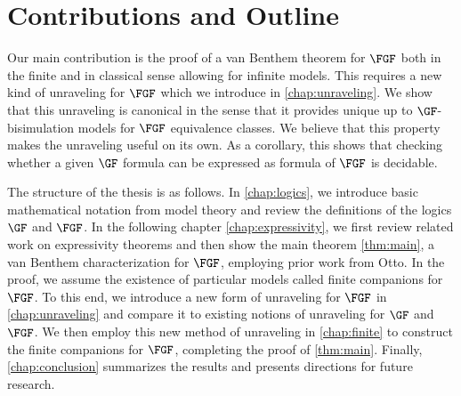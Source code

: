 \section{Contributions and Outline}

Our main contribution is the proof of a van Benthem theorem for $\FGF$ both in the finite and in classical sense allowing for infinite models.
This requires a new kind of unraveling for $\FGF$ which we introduce in \ref{chap:unraveling}.
We show that this unraveling is canonical in the sense that it provides unique up to $\GF$-bisimulation models for $\FGF$ equivalence classes.
We believe that this property makes the unraveling useful on its own.
As a corollary, this shows that checking whether a given $\GF$ formula can be expressed as formula of $\FGF$ is decidable.

The structure of the thesis is as follows.
In \cref{chap:logics}, we introduce basic mathematical notation from model theory and review the definitions of the logics $\GF$ and $\FGF$.
In the following chapter \cref{chap:expressivity}, we first review related work on expressivity theorems and then show the main theorem \cref{thm:main}, a van Benthem characterization for $\FGF$, employing prior work from Otto.
In the proof, we assume the existence of particular models called finite companions for $\FGF$.
To this end, we introduce a new form of unraveling for $\FGF$  in \cref{chap:unraveling} and compare it to existing notions of unraveling for $\GF$ and $\FGF$.
We then employ this new method of unraveling in \cref{chap:finite} to construct the finite companions for $\FGF$, completing the proof of \cref{thm:main}.
Finally, \cref{chap:conclusion} summarizes the results and presents directions for future research.
